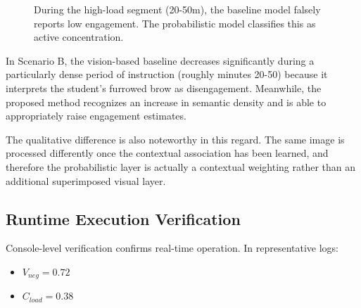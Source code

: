 \documentclass[conference]{IEEEtran}
\begin{document}
\begin{figure}[htbp]
\centering
{}
\caption{During the high-load segment (20-50m), the baseline model falsely reports low engagement. The probabilistic model classifies this as active concentration.}
\label{fig:results}
\end{figure}

In Scenario B, the vision-based baseline decreases significantly during a particularly dense period of instruction (roughly minutes 20-50) because it interprets the student's furrowed brow as disengagement. Meanwhile, the proposed method recognizes an increase in semantic density and is able to appropriately raise engagement estimates.

The qualitative difference is also noteworthy in this regard. The same image is processed differently once the contextual association has been learned, and therefore the probabilistic layer is actually a contextual weighting rather than an additional superimposed visual layer.

\subsection{Runtime Execution Verification}
Console-level verification confirms real-time operation. In representative logs:
\begin{itemize}
    \item $V_{neg} = 0.72$
    \item $C_{load} = 0.38$
\end{itemize}
\end{document}
